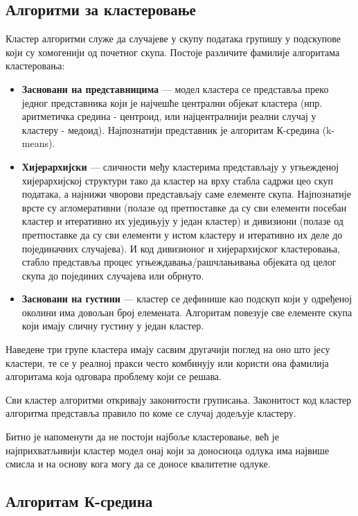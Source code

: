 \subsection{Алгоритми за кластеровање}
Кластер алгоритми служе да случајеве у скупу података групишу у подскупове који су хомогенији од почетног скупа. Постоје различите фамилије алгоритама кластеровања:

\begin{itemize}
  \item \textbf{Засновани на представницима} — модел кластера се представља преко једног представника који је најчешће централни објекат кластера (нпр. аритметичка средина - центроид, или најцентралнији реални случај у кластеру - медоид). Најпознатији представник је алгоритам К-средина (k-means).
  \item \textbf{Хијерархијски} — сличности међу кластерима представљају у угњежденој хијерархијској структури тако да кластер на врху стабла садржи цео скуп података, а најнижи чворови представљају саме елементе скупа. Најпознатије врсте су агломеративни (полазе од претпоставке да су сви елементи посебан кластер и итеративно их уједињују у један кластер) и дивизиони (полазе од претпоставке да су сви елементи у истом кластеру и итеративно их деле до појединачних случајева). И код дивизионог и хијерархијског кластеровања, стабло представља процес угњеждавања/рашчлањивања објеката од целог скупа до појединих случајева или обрнуто.
  \item \textbf{Засновани на густини} — кластер се дефинише као подскуп који у одређеној околини има довољан број елемената. Алгоритам повезује све елементе скупа који имају сличну густину у један кластер.
\end{itemize}
Наведене три групе кластера имају сасвим другачији поглед на оно што јесу кластери, те се у реалној пракси често комбинују или користи она фамилија алгоритама која одговара проблему који се решава.

Сви кластер алгоритми откривају законитости груписања. Законитост код кластер алгоритма представља правило по коме се случај додељује кластеру.

Битно је напоменути да не постоји најбоље кластеровање, већ је најприхватљивији кластер модел онај који за доносиоца одлука има највише смисла и на основу кога могу да се доносе квалитетне одлуке.

\subsection{Алгоритам К-средина}

